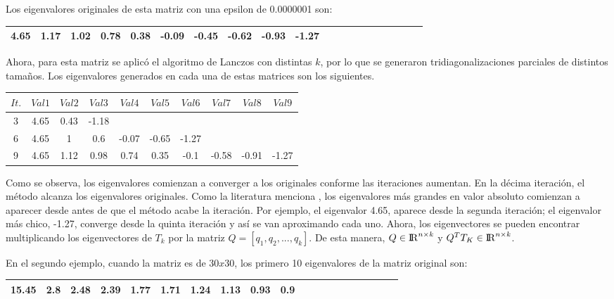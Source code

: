 \begin{example}
Los eigenvalores originales de esta matriz con una epsilon de 0.0000001 son:

\begin{center}
\begin{tabular}{ | c | c|  c |c | c|  c |c | c|  c |c | c | c|  c |c | c|  c |c | c|  c |c |} 
\hline
4.65 & 1.17 & 1.02 & 0.78 & 0.38 & -0.09 & -0.45 & -0.62 & -0.93 & -1.27\\
\hline
\hline
\end{tabular}
\end{center}

Ahora, para esta matriz se aplicó el algoritmo de Lanczos con distintas $k$, por lo que se generaron tridiagonalizaciones parciales de distintos tamaños. Los eigenvalores generados en cada una de estas matrices son los siguientes.

\begin{center}
\begin{tabular}{ | c | c|  c | c | c | c | c | c | c | c | } 
\hline
$It.$ & $Val1$ & $Val2$ & $Val3$ & $Val4$ & $Val5$ & $Val6$ & $Val7$ & $Val8$ & $Val9$\\
\hline
\hline
3 & 4.65 & 0.43 & -1.18 & & & & & &\\
\hline
6 & 4.65 & 1 & 0.6 & -0.07 & -0.65 & -1.27 & & & \\
\hline
9 & 4.65 & 1.12 & 0.98 & 0.74 & 0.35 & -0.1 & -0.58 & -0.91 & -1.27  \\
\hline
\end{tabular}
\end{center}

Como se observa, los eigenvalores comienzan a converger a los originales conforme las iteraciones aumentan. En la décima iteración, el método alcanza los eigenvalores originales. Como la literatura menciona \cite{golub2012matrix}, los eigenvalores más grandes en valor absoluto comienzan a aparecer desde antes de que el método acabe la iteración. Por ejemplo, el eigenvalor 4.65, aparece desde la segunda iteración; el eigenvalor más chico, -1.27, converge desde la quinta iteración y así se van aproximando cada uno. Ahora, los eigenvectores se pueden encontrar multiplicando los eigenvectores de $T_k$ por la matriz $Q = [q_1, q_2, ... , q_k]$. De esta manera, $Q \in {\rm I\!R}^{n \times k}$ y $Q^T T_K \in {\rm I\!R}^{n \times k}$.

En el segundo ejemplo, cuando la matriz es de $30x30$, los primero 10 eigenvalores de la matriz original son:
\begin{center}
\begin{tabular}{ | c | c|  c |c | c|  c |c | c|  c |c | c | c|  c |c | c|  c |c | c|  c |c |} 
\hline
15.45 & 2.8 & 2.48 & 2.39 & 1.77 & 1.71 & 1.24 & 1.13 & 0.93 & 0.9\\
\hline
\hline
\end{tabular}
\end{center}


\end{example}
